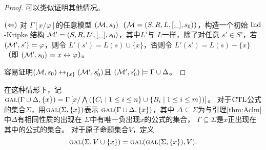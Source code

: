 \begin{proof}
	可以类似证明其他情况。
	
	
	$(\Leftarrow)$ 对 $\Gamma\left[x/\varphi \right]$的任意模型 $({\cal M}, s_0)$（${\cal M} = (S, R, L,[\_], s_0)$），构造一个初始 $\textrm{Ind}$-Kripke 结构 ${\cal M}'=(S, R, L',[\_], s_0)$，其中$L'$与 $L$一样，除了对任意 $s'\in S'$，若 $({\cal M}', s') \models \varphi$，则令 $L'(s') = L(s) \cup \{x\}$，否则令 $L'(s') = L(s)-\{x\}$（即 $({\cal M}', s_0) \models x \leftrightarrow \varphi$）。
	
	容易证明$({\cal M},s_0) \leftrightarrow_{\{x\}} ({\cal M}', s_0')$且 $({\cal M}',s_0') \models \Gamma \cup \Delta$。
\end{proof}


在这种情形下，记 $\textsc{gal}(\Gamma\cup\Delta,\{x\})=\Gamma\left[x/\bigwedge\left(\{C_i\mid 1\le i\le n\}\cup\{B_i\mid 1\le i\le m\}\right)\right]$。
%
对于$\textrm{CTL}$公式的集合$\Sigma$，用$\textsc{gal}(\Sigma,\{x\})$表示 $\textsc{gal}(\Gamma\cup\Delta,\{x\})$，其中 $\Delta\subseteq\Sigma$为与引理\ref{thm:Aclm}中$\Delta$有相同性质的出现在 $\Sigma$中有唯一负出现$x$的公式的集合， $\Gamma\subseteq \Sigma$是$x$正出现在其中的公式的集合。 
对于原子命题集合$V$，定义
$$\textsc{gal}(\Sigma,V\cup\{x\})=\textsc{gal}(\textsc{gal}(\Sigma,\{x\}),V).$$

